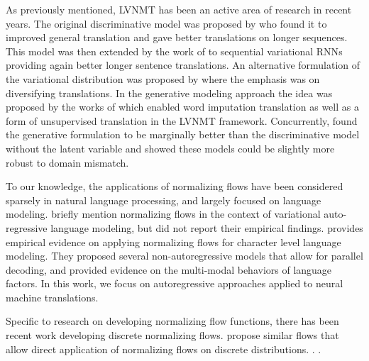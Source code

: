 As previously mentioned, \ac{LVNMT} has been an active area of research in recent years. The original discriminative model was proposed by \citet{Zhang2016VNMT} who found it to improved general translation and gave better translations on longer sequences. This model was then extended by the work of \citet{Su2018VRNMT} to sequential variational \ac{RNN}s providing again better longer sentence translations. An alternative formulation of the variational distribution was proposed by \citet{schulz2018StochasticDecoder} where the emphasis was on diversifying translations. In the generative modeling approach the idea was proposed by the works of \citet{harshil2018GNMT} which enabled word imputation translation as well as a form of unsupervised translation in the \ac{LVNMT} framework. Concurrently, \citet{eikema2018AEVNMT} found the generative formulation to be marginally better than the discriminative model without the latent variable and showed these models could be slightly more robust to domain mismatch. 

To our knowledge, the applications of normalizing flows have been considered sparsely in natural language processing, and largely focused on language modeling. \citet{bowman2015GeneratingSent} briefly mention normalizing flows in the context of variational auto-regressive language modeling, but did not report their empirical findings. \citet{ziegler2019LatentNFforDiscrete} provides empirical evidence on applying normalizing flows for character level language modeling. They proposed several non-autoregressive models that allow for parallel decoding, and provided evidence on the multi-modal behaviors of language factors. In this work, we focus on autoregressive approaches applied to neural machine translations.

Specific to research on developing normalizing flow functions, there has been recent work developing discrete normalizing flows. \cite{tran2019discreteflows,hoogeboom2019IntegerDiscreteFlows} propose similar flows that allow direct application of normalizing flows on discrete distributions. . .







